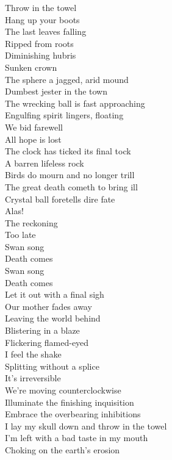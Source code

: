 Throw in the towel\\
Hang up your boots\\
The last leaves falling\\
Ripped from roots\\
Diminishing hubris\\
Sunken crown\\
The sphere a jagged, arid mound\\
Dumbest jester in the town\\
The wrecking ball is fast approaching\\
Engulfing spirit lingers, floating\\
We bid farewell\\
All hope is lost\\
The clock has ticked its final tock\\
A barren lifeless rock\\

Birds do mourn and no longer trill\\
The great death cometh to bring ill\\
Crystal ball foretells dire fate\\
Alas!\\
The reckoning\\
Too late\\

Swan song\\
Death comes\\
Swan song\\
Death comes\\

Let it out with a final sigh\\
Our mother fades away\\
Leaving the world behind\\
Blistering in a blaze\\
Flickering flamed-eyed\\
I feel the  shake\\
Splitting without a splice\\
It's irreversible\\
We're moving counterclockwise\\
Illuminate the finishing inquisition\\
Embrace the overbearing inhibitions\\
I lay my skull down and throw in the towel\\
I'm left with a bad taste in my mouth\\
Choking on the earth's erosion\\

